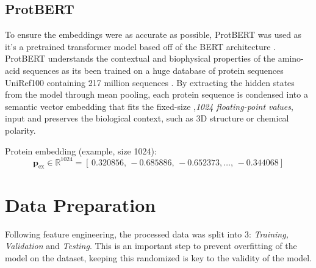 \subsection{ProtBERT}
To ensure the embeddings were as accurate as possible, ProtBERT was used as it's a pretrained transformer model based off of the BERT architecture \citep{devlin2019bertpretrainingdeepbidirectional}. ProtBERT understands the contextual and biophysical properties of the amino-acid sequences as its been trained on a huge database of protein sequences UniRef100 \citep{10.1093/nar/gkae1010} containing 217 million sequences \citep{Elnaggar2020.07.12.199554}. By extracting the hidden states from the model through mean pooling, each protein sequence is condensed into a semantic vector embedding that fits the fixed-size ,\textit{1024 floating-point values}, input and preserves the biological context, such as 3D structure or chemical polarity. \citep{ProtBERT}

Protein embedding (example, size 1024):
\[
\mathbf{p}_{\text{ex}} \in \mathbb{R}^{1024} =
[\,0.320856,\,-0.685886,\,-0.652373,\ldots,\,-0.344068]
\]

\section{Data Preparation}
Following feature engineering, the processed data was split into 3: \textit{Training, Validation} and \textit{Testing}. This is an important step to prevent overfitting of the model on the dataset, keeping this randomized is key to the validity of the model.
